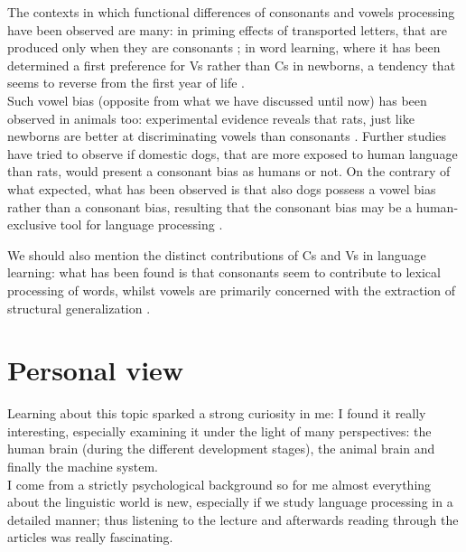 The contexts in which functional differences of consonants and vowels processing have been observed are many: in priming effects of transported letters, that are produced only when they are consonants \parencite{Parea_2004}; in word learning, where it has been determined a first preference for Vs rather than Cs in newborns, a tendency that seems to reverse from the first year of life \parencite{Nazzi_2015}. \\
Such vowel bias (opposite from what we have discussed until now) has been observed in animals too: experimental evidence reveals that rats, just like newborns are better at discriminating vowels than consonants \parencite{Toro_2019}. Further studies have tried to observe if domestic dogs, that are more exposed to human language than rats, would present a consonant bias as humans or not. On the contrary of what expected, what has been observed is that also dogs possess a vowel bias rather than a consonant bias, resulting that the consonant bias may be a human-exclusive tool for language processing \parencite{Mallikarjun_2021}. 

We should also mention the distinct contributions of Cs and Vs in language learning: what has been found is that consonants seem to contribute to lexical processing of words, whilst vowels are primarily concerned with the extraction of structural generalization \parencite{Bonatti_2005, Toro_2008}. 

\section*{Personal view}
Learning about this topic sparked a strong curiosity in me: I found it really interesting, especially examining it under the light of  many perspectives: the human brain (during the different development stages), the animal brain and finally the machine system. \\ 
I come from a strictly psychological background so for me almost everything about the linguistic world is new, especially if we study language processing in a detailed manner; thus listening to the lecture and afterwards reading through the articles was really fascinating.


